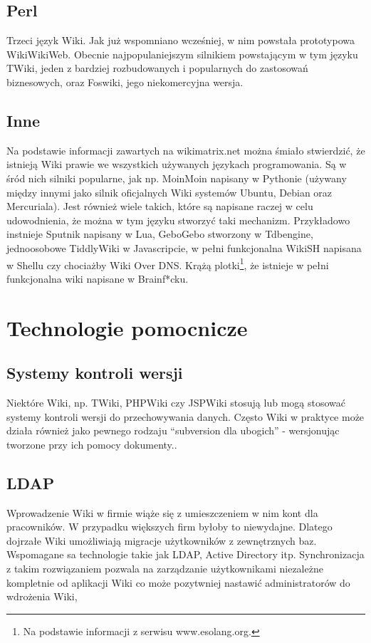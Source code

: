 \documentclass{article}
\begin{document}
	\subsection{Perl}
	Trzeci język Wiki. Jak już wspomniano wcześniej, w nim powstała prototypowa WikiWikiWeb. Obecnie najpopulaniejszym silnikiem powstającym w tym języku TWiki, jeden z bardziej rozbudowanych i popularnych do zastosowań biznesowych, oraz Foswiki, jego niekomercyjna wersja.  
	\subsection{Inne}
	Na podstawie informacji zawartych na wikimatrix.net można śmiało stwierdzić, że istnieją Wiki prawie we wszystkich używanych językach programowania. Są w śród nich silniki popularne, jak np. MoinMoin napisany w Pythonie (używany między innymi jako silnik oficjalnych Wiki systemów Ubuntu, Debian oraz Mercuriala). Jest również wiele takich, które są napisane raczej w celu udowodnienia, że można w tym języku stworzyć taki mechanizm. Przykładowo instnieje Sputnik napisany w Lua, GeboGebo stworzony w Tdbengine, jednoosobowe TiddlyWiki w Javascripcie, w pełni funkcjonalna WikiSH napisana w Shellu czy chociażby Wiki Over DNS. Krążą plotki\footnote{Na podstawie informacji z serwisu www.esolang.org.}, że istnieje w pełni funkcjonalna wiki napisane w Brainf*cku. 	

\newpage
\section{Technologie pomocnicze}
	\subsection{Systemy kontroli wersji}
	Niektóre Wiki, np. TWiki, PHPWiki czy JSPWiki stosują lub mogą stosować systemy kontroli wersji do przechowywania danych. Często Wiki w praktyce może działa również jako pewnego rodzaju ``subversion dla ubogich'' - wersjonując tworzone przy ich pomocy dokumenty..  
\subsection{LDAP}

Wprowadzenie Wiki w firmie wiąże się z umieszczeniem w nim kont dla pracowników. W przypadku większych firm byłoby to niewydajne. Dlatego dojrzałe Wiki umożliwiają migracje użytkowników z zewnętrznych baz. Wspomagane sa technologie takie jak LDAP, Active Directory itp. Synchronizacja z takim rozwiązaniem pozwala na zarządzanie użytkownikami niezależne kompletnie od aplikacji Wiki co może pozytwniej nastawić administratorów do wdrożenia Wiki,  
\end{document}
